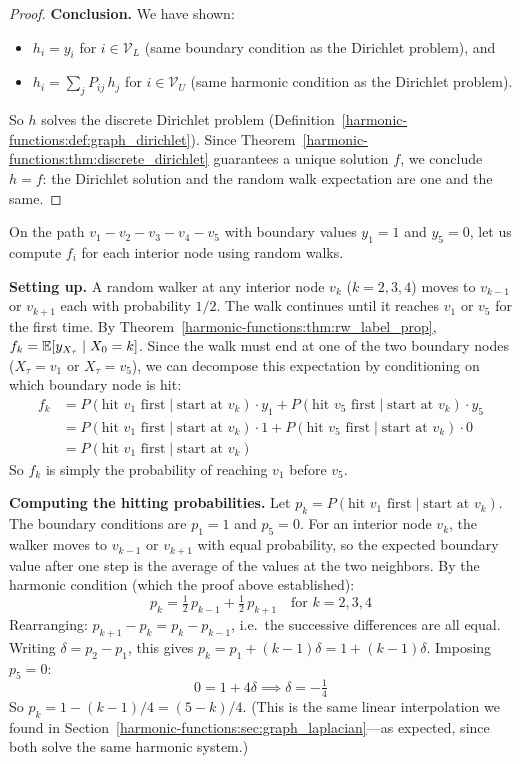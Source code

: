 \begin{notechapter}
\begin{proof}
\textbf{Conclusion.} We have shown:
\begin{itemize}
    \item $h_i = y_i$ for $i \in \mathcal{V}_L$ (same boundary condition
          as the Dirichlet problem), and
    \item $h_i = \sum_j P_{ij}\,h_j$ for $i \in \mathcal{V}_U$ (same
          harmonic condition as the Dirichlet problem).
\end{itemize}
So $h$ solves the discrete Dirichlet problem
(Definition~\ref{harmonic-functions:def:graph_dirichlet}). Since
Theorem~\ref{harmonic-functions:thm:discrete_dirichlet} guarantees a unique solution $f$, we
conclude $h = f$: the Dirichlet solution and the random walk expectation
are one and the same.
\end{proof}

\begin{examplebox}[title=Random Walk on the Path Graph]
On the path $v_1 - v_2 - v_3 - v_4 - v_5$ with boundary values
$y_1 = 1$ and $y_5 = 0$, let us compute $f_i$ for each interior node
using random walks.

\textbf{Setting up.} A random walker at any interior node $v_k$
($k = 2, 3, 4$) moves to $v_{k-1}$ or $v_{k+1}$ each with probability
$1/2$. The walk continues until it reaches $v_1$ or $v_5$ for the first
time. By Theorem~\ref{harmonic-functions:thm:rw_label_prop},
$f_k = \mathbb{E}[y_{X_\tau} \mid X_0 = k]$. Since the walk must end at one of the
two boundary nodes ($X_\tau = v_1$ or $X_\tau = v_5$), we can decompose this
expectation by conditioning on which boundary node is hit:
\begin{align*}
f_k &= P(\text{hit } v_1 \text{ first} \mid \text{start at } v_k)
  \cdot y_1
  + P(\text{hit } v_5 \text{ first} \mid \text{start at } v_k)
  \cdot y_5 \\
&= P(\text{hit } v_1 \text{ first} \mid \text{start at } v_k)
  \cdot 1
  + P(\text{hit } v_5 \text{ first} \mid \text{start at } v_k)
  \cdot 0 \\
&= P(\text{hit } v_1 \text{ first} \mid \text{start at } v_k)
\end{align*}
So $f_k$ is simply the probability of reaching $v_1$ before $v_5$.

\textbf{Computing the hitting probabilities.} Let $p_k = P(\text{hit }
v_1 \text{ first} \mid \text{start at } v_k)$. The boundary conditions are
$p_1 = 1$ and $p_5 = 0$. For an interior node $v_k$, the walker moves to
$v_{k-1}$ or $v_{k+1}$ with equal probability, so the expected boundary
value after one step is the average of the values at the two neighbors.
By the harmonic condition (which the proof above established):
\[
p_k = \tfrac{1}{2}\,p_{k-1} + \tfrac{1}{2}\,p_{k+1}
\quad\text{for } k = 2, 3, 4
\]
Rearranging: $p_{k+1} - p_k = p_k - p_{k-1}$, i.e.\ the successive
differences are all equal. Writing $\delta = p_2 - p_1$, this gives
$p_k = p_1 + (k-1)\delta = 1 + (k-1)\delta$. Imposing $p_5 = 0$:
\[
0 = 1 + 4\delta \implies \delta = -\tfrac{1}{4}
\]
So $p_k = 1 - (k-1)/4 = (5-k)/4$. (This is the same linear interpolation
we found in Section~\ref{harmonic-functions:sec:graph_laplacian}---as expected, since both
solve the same harmonic system.)


\end{examplebox}
\end{notechapter}
